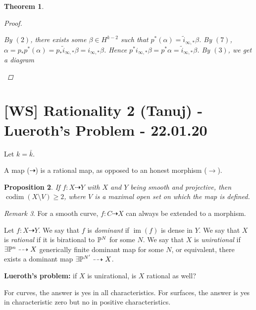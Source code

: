 \documentclass[A4paper, british, reqno]{amsart}
\theoremstyle{darkgreentheorem}
\newtheorem{thm}{Theorem}[section]
\newtheorem{prop}[thm]{Proposition}
\theoremstyle{darkbluedefinition}
\theoremstyle{darkredexample}
\theoremstyle{remark}
\newtheorem{rem}[thm]{Remark}
\DeclareMathOperator{\im}{im}
\newcommand{\1}{\mathbbm{1}}
\newcommand{\op}{\oplus}
\begin{document}
\begin{thm}
\begin{proof}
\begin{enumerate}
		By $(2)$, there exists some $\beta \in H^{k-2}$ such that $p^{*}(\alpha)=\tilde{i}_{\infty,*}\beta $.
		By $(7)$, $\alpha=p_{*}p^{*}(\alpha)=p_{*}\tilde{i}_{\infty,*}\beta=i_{\infty,*}\beta$.
		Hence $p^{*}i_{\infty,*}\beta=p^{*}\alpha = \tilde{i}_{\infty,*}\beta$.
		By $(3)$, we get a diagram
		\begin{center}
		\end{center}

	\end{enumerate}
    \end{proof}
\end{thm}

\section{[WS] Rationality 2 (Tanuj) - Lueroth's Problem - 22.01.20}

Let $k=\bar{k}$.

A map ($\dashrightarrow$) is a rational map, as opposed to an honest morphism ($\to$).

\begin{prop}
    If $f\colon X\dashrightarrow Y$ with $X$ and $Y$ being smooth and projective, then $\operatorname{codim}(X\setminus V) \geqslant 2$, where $V$ is a maximal open set on which the map is defined.
\end{prop}

\begin{rem}
    For a smooth curve, $f\colon C\dashrightarrow X$ can always be extended to a morphism.
\end{rem}

Let $f\colon X\dashrightarrow Y$.
We say that $f$ is \textit{dominant} if $\im(f)$ is dense in $Y$.
We say that $X$ is \textit{rational} if it is birational to $\P^{N}$ for some $N$.
We say that $X$ is \textit{unirational} if $\exists \P^{n}\dashrightarrow X$ generically finite dominant map for some $N$, or equivalent, there exists a dominant map $\exists \P^{N'}\dashrightarrow X$.

\textbf{Lueroth's problem:}
if $X$ is unirational, is $X$ rational as well?

For curves, the answer is yes in all characteristics.
For surfaces, the answer is yes in characteristic zero but no in positive characteristics.
\end{document}
